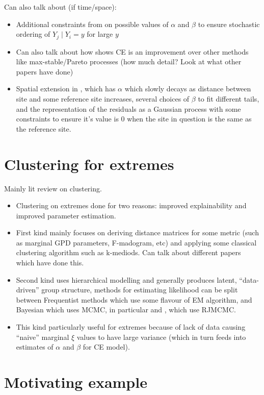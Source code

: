 \documentclass{article}
\numberwithin{equation}{section}
\begin{document}
Can also talk about (if time/space):
\begin{itemize}
  \item Additional constraints from \cite{Keef2013} on possible values of $\alpha$ and $\beta$ to ensure stochastic ordering of $Y_j \mid Y_i = y$ for large $y$ 
  \item Can also talk about how \cite{Tawn2018} shows CE is an improvement over other methods like max-stable/Pareto processes (how much detail? Look at what other papers have done)
  \item Spatial extension in \cite{Wadsworth2018}, which has $\alpha$ which slowly decays as distance between site and some reference site increases, several choices of $\beta$ to fit different tails, and the representation of the residuals as a Gaussian process with some constraints to ensure it's value is 0 when the site in question is the same as the reference site. 
\end{itemize}

\section{Clustering for extremes}\label{sec:clustering}

Mainly lit review on clustering. 
\begin{itemize}
  \item Clustering on extremes done for two reasons: improved explainability and improved parameter estimation. 
  \item First kind mainly focuses on deriving distance matrices for some metric (such as marginal GPD parameters, F-madogram, etc) and applying some classical clustering algorithm such as k-mediods. Can talk about different papers which have done this.
  \item Second kind uses hierarchical modelling and generally produces latent, ``data-driven'' group structure, methods for estimating likelihood can be split between Frequentist methods which use some flavour of EM algorithm, and Bayesian which uses MCMC, in particular \cite{Bottolo2003} and  \cite{Rohrbeck2021}, which use RJMCMC. 
  \item This kind particularly useful for extremes because of lack of data causing ``naive'' marginal $\xi$ values to have large variance (which in turn feeds into estimates of $\alpha$ and $\beta$ for CE model). 
\end{itemize}



\section{Motivating example}\label{sec:example}
\end{document}
